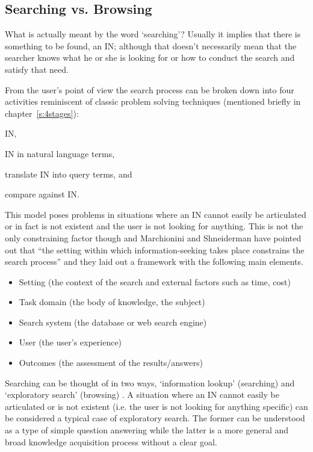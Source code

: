 \subsection{Searching vs. Browsing}
\label{s:browsing}

What is actually meant by the word `searching'? Usually it implies that there is something to be found, an \ac{IN}; although that doesn't necessarily mean that the searcher knows what he or she is looking for or how to conduct the search and satisfy that need.

From the user's point of view the search process can be broken down into four activities \autocite{Sutcliffe1998} reminiscent of classic problem solving techniques (mentioned briefly in chapter~\ref{s:4stages})\autocite{Polya1957}:

\begin{description}[leftmargin=5cm]
  \item [Problem identification] \acf{IN},
  \item [Need articulation] \ac{IN} in natural language terms,
  \item [Query formulation] translate \ac{IN} into query terms, and
  \item [Results evaluation] compare against \ac{IN}.
\end{description}

This model poses problems in situations where an \ac{IN} cannot easily be articulated or in fact is not existent and the user is not looking for anything. This is not the only constraining factor though and Marchionini and Shneiderman have pointed out that ``the setting within which information-seeking takes place constrains the search process'' \autocite*{Marchionini1988} and they laid out a framework with the following main elements.

\begin{itemize}
  \item Setting (the context of the search and external factors such as time, cost)
  \item Task domain (the body of knowledge, the subject)
  \item Search system (the database or web search engine)
  \item User (the user’s experience)
  \item Outcomes (the assessment of the results/answers)
\end{itemize}

Searching can be thought of in two ways, `information lookup' (searching) and `exploratory search' (browsing) \autocite{DeVries1993, Marchionini2006}. A situation where an \ac{IN} cannot easily be articulated or is not existent (i.e. the user is not looking for anything specific) can be considered a typical case of exploratory search. The former can be understood as a type of simple question answering while the latter is a more general and broad knowledge acquisition process without a clear goal.

